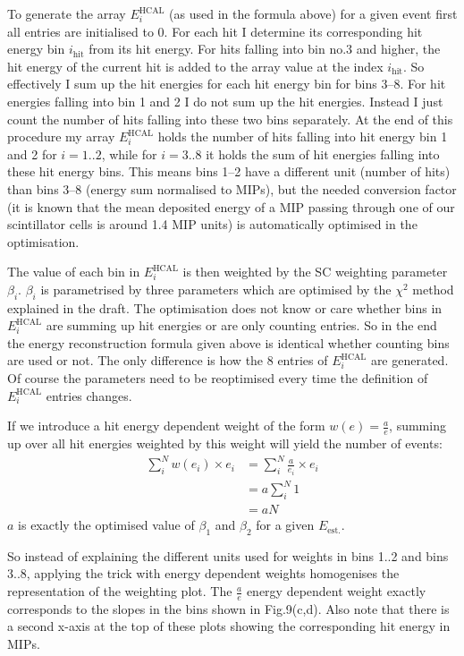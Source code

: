 \documentclass[twoside,a4paper,12pt]{article}
\begin{document}
To generate the array $E_i^\text{HCAL}$ (as used in the formula above) for a given event first all entries are initialised to 0. For each hit I determine its corresponding hit energy bin $i_\text{hit}$ from its hit energy. For hits falling into bin no.3 and higher, the hit energy of the current hit is added to the array value at the index $i_\text{hit}$. So effectively I sum up the hit energies for each hit energy bin for bins 3--8. For hit energies falling into bin 1 and 2 I do not sum up the hit energies. Instead I just count the number of hits falling into these two bins separately. At the end of this procedure my array $E_i^\text{HCAL}$ holds the number of hits falling into hit energy bin 1 and 2 for $i=1..2$, while for $i=3..8$ it holds the sum of hit energies falling into these hit energy bins. This means bins 1--2 have a different unit (number of hits) than bins 3--8 (energy sum normalised to MIPs), but the needed conversion factor (it is known that the mean deposited energy of a MIP passing through one of our scintillator cells is around 1.4 MIP units) is automatically optimised in the optimisation.

The value of each bin in $E_i^\text{HCAL}$ is then weighted by the SC weighting parameter $\beta_i$. $\beta_i$ is parametrised by three parameters which are optimised by the $\chi^2$ method explained in the draft. The optimisation does not know or care whether bins in $E_i^\text{HCAL}$ are summing up hit energies or are only counting entries. So in the end the energy reconstruction formula given above is identical whether counting bins are used or not. The only difference is how the 8 entries of $E_i^\text{HCAL}$ are generated. Of course the parameters need to be reoptimised every time the definition of $E_i^\text{HCAL}$ entries changes.

If we introduce a hit energy dependent weight of the form $w(e) = \frac{a}{e}$, summing up over all hit energies weighted by this weight will yield the number of events:
\begin{align}
 \sum_i^N w(e_i)\times e_i 	&= \sum_i^N \frac{a}{e_i}\times e_i \\
				&= a \sum_i^N 1\\
				&= aN
\end{align}
$a$ is exactly the optimised value of $\beta_1$ and $\beta_2$ for a given $E_\text{est.}$.

So instead of explaining the different units used for weights in bins 1..2 and bins 3..8, applying the trick with energy dependent weights homogenises the representation of the weighting plot. The $\frac{a}{e}$ energy dependent weight exactly corresponds to the slopes in the bins shown in Fig.9(c,d). Also note that there is a second x-axis at the top of these plots showing the corresponding hit energy in MIPs.
\end{document}
